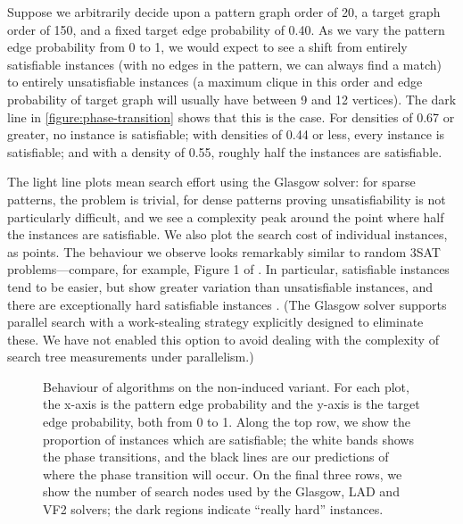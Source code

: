 \documentclass[letterpaper]{article}
\newcommand{\citet}[1]{\citeauthor{#1} \shortcite{#1}}
\newcommand{\citep}[1]{\cite{#1}}
\begin{document}
Suppose we arbitrarily decide upon a pattern graph order of 20, a target graph order of 150, and a
fixed target edge probability of 0.40. As we vary the pattern edge probability from 0 to 1, we would
expect to see a shift from entirely satisfiable instances (with no edges in the pattern, we can
always find a match) to entirely unsatisfiable instances (a maximum clique in this order and edge
probability of target graph will usually have between 9 and 12 vertices). The dark line in
\cref{figure:phase-transition} shows that this is the case. For densities of 0.67 or greater, no
instance is satisfiable; with densities of 0.44 or less, every instance is satisfiable; and with a
density of 0.55, roughly half the instances are satisfiable.

The light line plots mean search effort using the Glasgow solver: for sparse patterns, the problem
is trivial, for dense patterns proving unsatisfiability is not particularly difficult, and we see a
complexity peak around the point where half the instances are satisfiable.  We also plot the search
cost of individual instances, as points. The behaviour we observe looks remarkably similar to random
3SAT problems---compare, for example, Figure 1 of \citet{LeytonBrown:2014}. In particular,
satisfiable instances tend to be easier, but show greater variation than unsatisfiable instances, and
there are exceptionally hard satisfiable instances \citep{Smith:1997}. (The Glasgow solver supports
parallel search with a work-stealing strategy explicitly designed to eliminate these. We have not
enabled this option to avoid dealing with the complexity of search tree measurements under
parallelism.)

\begin{figure}[tb]
    
    \caption{Behaviour of algorithms on the non-induced variant. For each plot, the x-axis is the
        pattern edge probability and the y-axis is the target edge probability, both from 0 to 1.
        Along the top row, we show the proportion of instances which are satisfiable; the white
        bands shows the phase transitions, and the black lines are our predictions of where the
        phase transition will occur. On the final three rows, we show the number of search nodes used by the
        Glasgow, LAD and VF2 solvers; the dark regions indicate ``really hard'' instances.}
    \label{figure:non-induced}
\end{figure}
\end{document}
